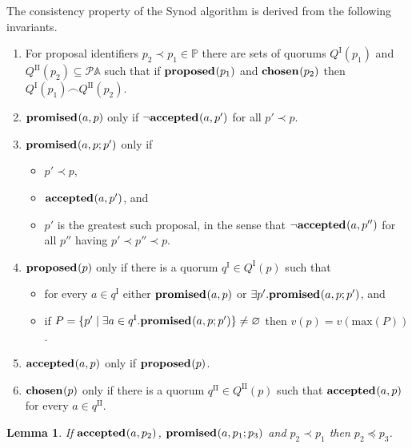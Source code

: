 \documentclass[journal]{IEEEtran}
\newtheorem{lemma}[theorem]{Lemma}
\begin{document}
The consistency property of the Synod algorithm is derived from the following
invariants.

\begin{enumerate}

\item \label{synod-quorums} For proposal identifiers $p_2 \prec p_1 \in \mathbb
P$ there are sets of quorums $Q^\textrm{I}(p_1)$ and
$Q^\textrm{II}(p_2) \subseteq \mathcal P \mathbb A$ such that if $\mathbf{proposed}_{}(p_1)$
and $\mathbf{chosen}_{}(p_2)$ then ${Q^\textrm{I}(p_1) \frown Q^\textrm{II}(p_2)}$.

\item \label{synod-fprom} $\mathbf{promised}_{}(a,p)$ only if $\neg\mathbf{accepted}_{}(a,p')$ for all
${p' \prec p}$.

\item \label{synod-bprom} $\mathbf{promised}_{}(a,p;p')$ only if
\begin{itemize}
\item $p' \prec p$,
\item $\mathbf{accepted}_{}(a,p')$, and
\item $p'$ is the greatest such proposal, in the sense that
$\neg\mathbf{accepted}_{}(a,p'')$ for all $p''$ having $p' \prec p'' \prec p$.
\end{itemize}

\item \label{synod-prop} $\mathbf{proposed}_{}(p)$ only if there is a quorum $q^\textrm{I}
\in Q^\textrm{I}(p)$ such that
\begin{itemize}
\item for every $a \in q^\textrm{I}$ either $\mathbf{promised}_{}(a,p)$ or $\exists p'.
\mathbf{promised}_{}(a,p;p')$, and
\item if $P = \{ p' \mid \exists a \in q^\textrm{I}. \mathbf{promised}_{}(a,p;p') \}
\ne \varnothing$ then $v(p) = v(\mathrm{max}(P))$.
\end{itemize}

\item \label{synod-acc} $\mathbf{accepted}_{}(a,p)$ only if $\mathbf{proposed}_{}(p)$.

\item \label{synod-chosen} $\mathbf{chosen}_{}(p)$ only if there is a quorum
$q^\textrm{II} \in Q^\textrm{II}(p)$ such that $\mathbf{accepted}_{}(a,p)$ for every $a \in
q^\textrm{II}$.

\end{enumerate}

\begin{lemma}\label{synod-acc-bprom}If $\mathbf{accepted}_{}(a,p_2)$, $\mathbf{promised}_{}(a,p_1;p_3)$
and $p_2 \prec p_1$ then $p_2 \preceq p_3$.\end{lemma}
\end{document}
